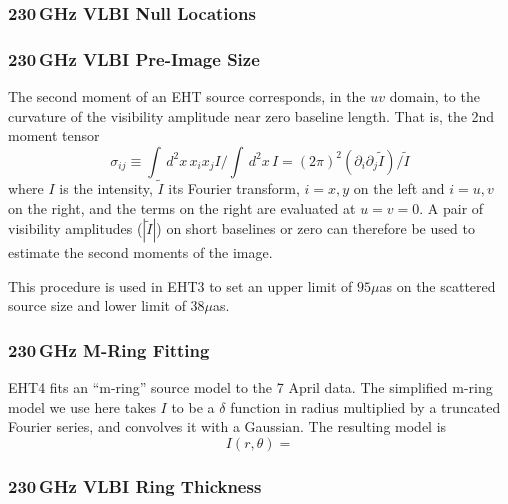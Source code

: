 \subsubsection{230\,GHz VLBI Null Locations}

\subsubsection{230\,GHz VLBI Pre-Image Size}

The second moment of an EHT source corresponds, in the $uv$ domain, to the curvature of the visibility amplitude near zero baseline length.  That is, the 2nd moment tensor
\begin{equation}
    \sigma_{ij} \equiv \int \, d^2x\, x_i x_j I/\int \, d^2x \, I = (2\pi)^2 \left(\partial_i \partial_j \tilde{I}\right)/\tilde{I}
\end{equation}
where $I$ is the intensity, $\tilde{I}$ its Fourier transform, $i = x,y$ on the left and $i = u,v$ on the right, and the terms on the right are evaluated at $u = v = 0$.  A pair of visibility amplitudes ($|\tilde{I}|$) on short baselines or zero can therefore be used to estimate the second moments of the image.

This procedure is used in EHT3 to set an upper limit of $95\mu$as on the scattered source size and lower limit of $38\mu$as.

\subsubsection{230\,GHz M-Ring Fitting}

EHT4 fits an ``m-ring'' source model to the 7 April data.  The simplified m-ring model we use here takes $I$ to be a $\delta$ function in radius multiplied by a truncated Fourier series, and convolves it with a Gaussian.  The resulting model is
\begin{equation}
    I(r,\theta) =
\end{equation}

\subsubsection{230\,GHz VLBI Ring Thickness}

